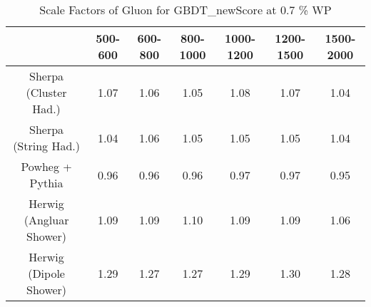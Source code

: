 \begin{table}
\centering
\caption{Scale Factors of Gluon for GBDT_newScore at 0.7 \% WP}
\label{tab:SF_MC_GBDT_newScore_0.7_Gluon}
\begin{tabular}{ccccccc}
\toprule
{} &  500-600 &  600-800 &  800-1000 &  1000-1200 &  1200-1500 &  1500-2000 \\
\midrule
Sherpa (Cluster Had.)   &     1.07 &     1.06 &      1.05 &       1.08 &       1.07 &       1.04 \\
Sherpa (String Had.)    &     1.04 &     1.06 &      1.05 &       1.05 &       1.05 &       1.04 \\
Powheg + Pythia         &     0.96 &     0.96 &      0.96 &       0.97 &       0.97 &       0.95 \\
Herwig (Angluar Shower) &     1.09 &     1.09 &      1.10 &       1.09 &       1.09 &       1.06 \\
Herwig (Dipole Shower)  &     1.29 &     1.27 &      1.27 &       1.29 &       1.30 &       1.28 \\
\bottomrule
\end{tabular}
\end{table}
